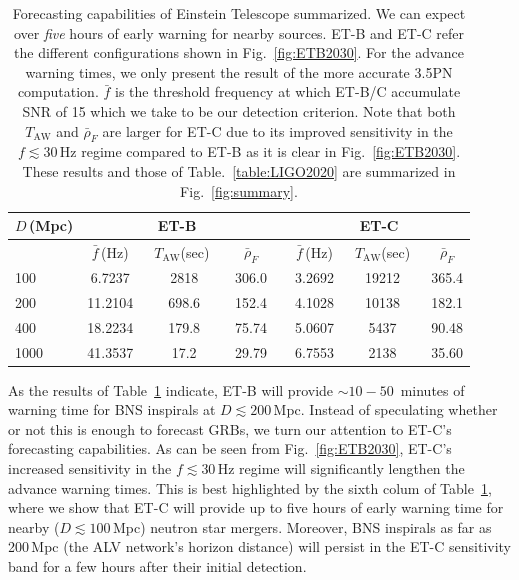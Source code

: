 \documentclass[amsmath,amssymb,aps,floats,amsfonts,notitlepage,superscriptaddress,eqsecnum,nofootinbib,10pt]{revtex4-1}
\newcommand\T{\rule{0pt}{2.6ex}}       %
\newcommand\B{\rule[-1.2ex]{0pt}{0pt}} %
\begin{document}
\begin{table}[h]
\centering
\begin{tabular}{l|ccccccc}
\hline
$D\,$(Mpc) & \multicolumn{3}{c}{ET-B} &  & \multicolumn{3}{c}{ET-C}\T\B\\
\hline
{}& $\bar{f}\,$(Hz) & \ $T_\text{AW}$(sec) \ & $\bar{\rho}_{F}$ &{} & $\bar{f}\,$(Hz) & \ $T_\text{AW}$(sec)\ & $\bar{\rho}_{F}$\T\B\\

100 & 6.7237 &  2818 & 306.0 &{\qquad} & 3.2692 & 19212 & 365.4\T\\
200 & 11.2104 & 698.6 & 152.4 &{\qquad} & 4.1028 & 10138 & 182.1 \\
400 & 18.2234 & 179.8 & 75.74 &{\qquad} & 5.0607 & 5437 & 90.48\\
1000 & 41.3537 &17.2 & 29.79& \qquad & 6.7553 & 2138 & 35.60  \\
\hline
\end{tabular}
\caption{Forecasting capabilities of Einstein Telescope summarized. We can expect over \emph{five} hours of early warning for nearby sources. 
ET-B and ET-C refer the different configurations shown in Fig.~\ref{fig:ETB2030}. For the advance warning times, we only present the result of the more accurate 3.5PN computation. $\bar{f}$ is the threshold frequency at which
ET-B/C accumulate SNR of 15 which we take to be our detection criterion. Note that both $T_\text{AW}$ and $\bar\rho_F$ are larger for ET-C
due to its improved sensitivity in the $f\lesssim 30\,$Hz regime compared to ET-B as it is clear in Fig.~\ref{fig:ETB2030}.
These results and those of Table.~\ref{table:LIGO2020} are summarized in Fig.~\ref{fig:summary}.}\label{table:ET}
\end{table}
%
%
As the results of Table~\ref{table:ET} indicate, ET-B will provide $\sim 10 - 50\,$ minutes of warning time for BNS inspirals at $D\lesssim 200\,$Mpc.
Instead of speculating whether or not this is enough to forecast GRBs, we turn our attention to ET-C's forecasting capabilities.
As can be seen from Fig.~\ref{fig:ETB2030}, ET-C's increased sensitivity in the $f\lesssim 30\,$Hz regime will significantly lengthen the advance warning times.
This is best highlighted by the sixth colum of Table~\ref{table:ET}, 
where we show that ET-C will provide up to five hours of early warning time for nearby ($D\lesssim 100\,$Mpc) neutron star mergers.
Moreover, BNS inspirals as far as 200\,Mpc (the ALV network's horizon distance) will persist in the ET-C sensitivity band for a few hours after their initial detection.
\end{document}
